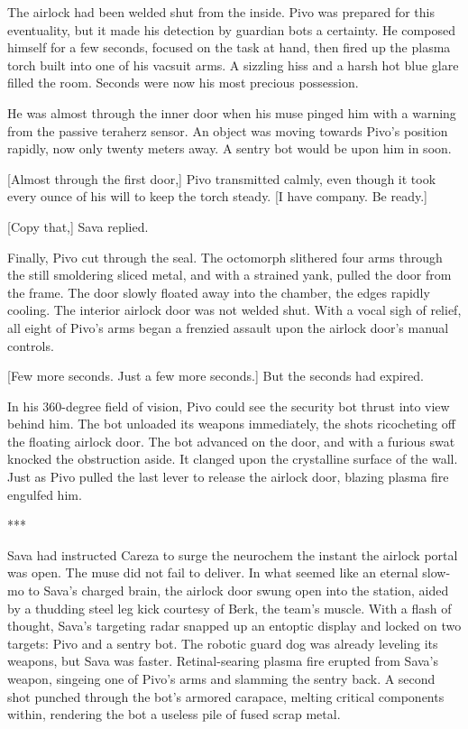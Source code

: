 The airlock had been welded shut from the inside. Pivo was prepared
for this eventuality, but it made his detection by guardian bots a
certainty. He composed himself for a few seconds, focused on the task
at hand, then fired up the plasma torch built into one of his vacsuit
arms. A sizzling hiss and a harsh hot blue glare filled the
room. Seconds were now his most precious possession.

He was almost through the inner door when his muse pinged him with a
warning from the passive teraherz sensor. An object was moving towards
Pivo's position rapidly, now only twenty meters away. A sentry bot
would be upon him in soon.

[Almost through the first door,] Pivo transmitted calmly, even though
it took every ounce of his will to keep the torch steady. [I have
company. Be ready.]

[Copy that,] Sava replied.

Finally, Pivo cut through the seal. The octomorph slithered four arms
through the still smoldering sliced metal, and with a strained yank,
pulled the door from the frame. The door slowly floated away into the
chamber, the edges rapidly cooling. The interior airlock door was not
welded shut. With a vocal sigh of relief, all eight of Pivo's arms
began a frenzied assault upon the airlock door's manual controls.

[Few more seconds. Just a few more seconds.] But the seconds had
expired.

In his 360-degree field of vision, Pivo could see the security bot
thrust into view behind him. The bot unloaded its weapons immediately,
the shots ricocheting off the floating airlock door. The bot advanced
on the door, and with a furious swat knocked the obstruction aside. It
clanged upon the crystalline surface of the wall. Just as Pivo pulled
the last lever to release the airlock door, blazing plasma fire
engulfed him.

\begin{center}
  ***
\end{center}

Sava had instructed Careza to surge the neurochem the instant the
airlock portal was open. The muse did not fail to deliver. In what
seemed like an eternal slow-mo to Sava's charged brain, the airlock
door swung open into the station, aided by a thudding steel leg kick
courtesy of Berk, the team's muscle. With a flash of thought, Sava's
targeting radar snapped up an entoptic display and locked on two
targets: Pivo and a sentry bot. The robotic guard dog was already
leveling its weapons, but Sava was faster. Retinal-searing plasma fire
erupted from Sava's weapon, singeing one of Pivo's arms and slamming
the sentry back. A second shot punched through the bot's armored
carapace, melting critical components within, rendering the bot a
useless pile of fused scrap metal.


